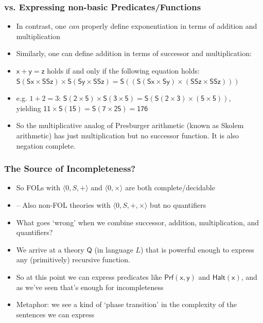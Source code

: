 \begin{frame}
\frametitle{vs. Expressing non-basic Predicates/Functions}

\begin{itemize}[<+->]

\item In contrast, one \textit{can} properly define exponentiation in terms of addition and multiplication

\item Similarly, one can define addition in terms of successor and multiplication:

\item[] $\mathsf{x + y = z}$ holds if and only if the following equation holds: \\ 
\footnotesize{$\mathsf{S(Sx\times SSz)\times S(Sy \times SSz) = S( ( S( Sx \times Sy) \times (SSz \times SSz)))}$}



\item[] e.g. $1+2 = 3$: $\mathsf{S(2 \times 5) \times S (3 \times 5) = S ( S (2 \times 3) \times (5 \times 5))}$, \\ yielding $\mathsf{11 \times S(15) = S (7 \times 25) = 176}$

\item So the multiplicative analog of Presburger arithmetic (known as Skolem arithmetic) has just multiplication but no successor function. It is also negation complete. 

\end{itemize}
\end{frame}

\begin{frame}
\frametitle{The Source of Incompleteness?}

\begin{itemize}[<+->]

\item So FOLs with $\langle 0, S, + \rangle$ and $\langle 0, \times \rangle$ are both complete/decidable

\item[] -- Also non-FOL theories with $\langle 0, S, +, \times \rangle$ but no quantifiers

\item What goes `wrong' when we combine successor, addition, multiplication, and quantifiers?

\item We arrive at a theory $\mathsf{Q}$ (in language $L$) that is powerful enough to express any (primitively) recursive function. 

\item So at this point we can express predicates like $\mathsf{Prf (x, y)}$ and $\mathsf{Halt (x)}$, and as we've seen that's enough for incompleteness 

\item Metaphor: we see a kind of `phase transition' in the complexity of the sentences we can express 
\end{itemize}
\end{frame}


